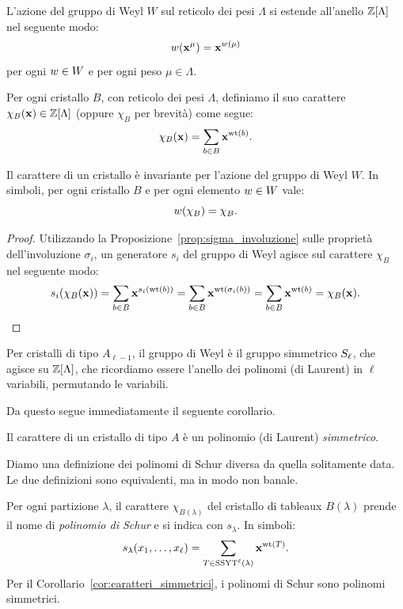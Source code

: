\begin{remark}
    L'azione del gruppo di Weyl $W$ sul reticolo dei pesi $\Lambda$ si estende 
    all'anello $\mathbb{Z}[\Lambda]$ nel seguente modo:
    \[
        w(\mathbf{x}^\mu) = \mathbf{x}^{w(\mu)}
    \]
    per ogni $w \in W$ e per ogni peso $\mu \in \Lambda$.
\end{remark}



\begin{definition}
    Per ogni cristallo $B$, con reticolo dei pesi $\Lambda$, definiamo il suo carattere
    $\chi_B(\mathbf{x}) \in \mathbb{Z}[\Lambda]$ (oppure $\chi_B$ per brevit\`a) come segue:
    \[
        \chi_B(\mathbf{x}) = \sum_{b \in B} \mathbf{x}^{\operatorname{wt}(b)}.
    \]
\end{definition}

\begin{proposition}
    Il carattere di un cristallo \`e invariante per l'azione del gruppo di Weyl $W$.
    In simboli, per ogni cristallo $B$ e per ogni elemento $w \in W$ vale:
    \[
        w( \chi_B ) = \chi_B.
    \]
\end{proposition}

\begin{proof}
    Utilizzando la Proposizione~\ref{prop:sigma_involuzione} sulle 
    propriet\`a dell'involuzione $\sigma_i$, un generatore $s_i$ del gruppo di Weyl 
agisce sul carattere $\chi_B$ nel seguente modo:
    \[
        s_i ( \chi_B(\mathbf{x})) 
        = \sum_{b \in B} \mathbf{x}^{s_i (\operatorname{wt}(b)) }
        = \sum_{b \in B} \mathbf{x}^{\operatorname{wt}(\sigma_i (b))}
        = \sum_{b \in B} \mathbf{x}^{\operatorname{wt}(b)}
        = \chi_B(\mathbf{x}).
        \qedhere
    \]
\end{proof}

Per cristalli di tipo $A_{\ell-1}$, il gruppo di Weyl \`e il gruppo simmetrico $S_\ell$,
che agisce su $\mathbb{Z}[\Lambda]$, che ricordiamo essere l'anello dei 
polinomi (di Laurent) in $\ell$ variabili, permutando le variabili.

Da questo segue immediatamente il seguente corollario.

\begin{corollary}
    \label{cor:caratteri_simmetrici}
    Il carattere di un cristallo di tipo $A$ \`e un polinomio (di Laurent) \emph{simmetrico}.
\end{corollary}

Diamo una definizione dei polinomi di Schur diversa da quella solitamente data.
Le due definizioni sono equivalenti, ma in modo non banale.

\begin{definition}
    \label{def:polinomi_schur}
    Per ogni partizione $\lambda$, il carattere $\chi_{B(\lambda)}$
    del cristallo di tableaux $B(\lambda)$  prende il nome di
    \emph{polinomio di Schur} e si indica con $s_\lambda$.
    In simboli:
    \[
        s_\lambda(x_1, \dots, x_\ell) = 
        \sum_{T \in \operatorname{SSYT}^\ell(\lambda)} \mathbf{x}^{\operatorname{wt}(T)}.
    \]
    Per il Corollario~\ref{cor:caratteri_simmetrici}, i polinomi di Schur
    sono polinomi simmetrici.
\end{definition}

